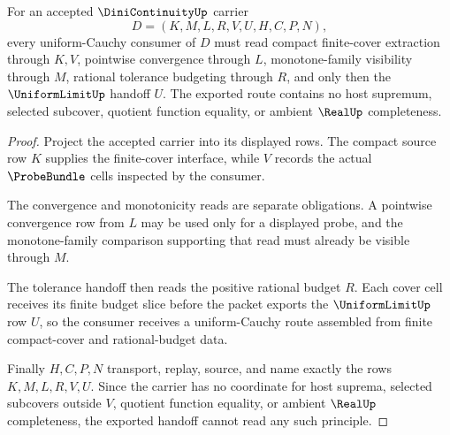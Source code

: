 \begin{theorem}
\label{thm:dini-continuity-uniform-cauchy-handoff}
For an accepted $\DiniContinuityUp$ carrier
$$
D=(K,M,L,R,V,U,H,C,P,N),
$$
every uniform-Cauchy consumer of $D$ must read compact finite-cover extraction through $K,V$, pointwise convergence through $L$, monotone-family visibility through $M$, rational tolerance budgeting through $R$, and only then the $\UniformLimitUp$ handoff $U$. The exported route contains no host supremum, selected subcover, quotient function equality, or ambient $\RealUp$ completeness.
\end{theorem}
\begin{proof}
Project the accepted carrier into its displayed rows. The compact source row $K$ supplies the finite-cover interface, while $V$ records the actual $\ProbeBundle$ cells inspected by the consumer.

The convergence and monotonicity reads are separate obligations. A pointwise convergence row from $L$ may be used only for a displayed probe, and the monotone-family comparison supporting that read must already be visible through $M$.

The tolerance handoff then reads the positive rational budget $R$. Each cover cell receives its finite budget slice before the packet exports the $\UniformLimitUp$ row $U$, so the consumer receives a uniform-Cauchy route assembled from finite compact-cover and rational-budget data.

Finally $H,C,P,N$ transport, replay, source, and name exactly the rows $K,M,L,R,V,U$. Since the carrier has no coordinate for host suprema, selected subcovers outside $V$, quotient function equality, or ambient $\RealUp$ completeness, the exported handoff cannot read any such principle.
\end{proof}

